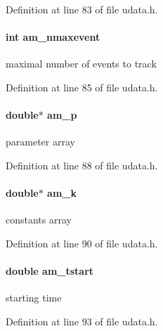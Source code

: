 Definition at line 83 of file udata.\+h.

\hypertarget{struct_user_data_adfa3a6bf6b41a27f98cac31557e6930f}{}
\paragraph[{am\+\_\+nmaxevent}]{\setlength{\rightskip}{0pt plus 5cm}int am\+\_\+nmaxevent}\label{struct_user_data_adfa3a6bf6b41a27f98cac31557e6930f}
maximal number of events to track 

Definition at line 85 of file udata.\+h.

\hypertarget{struct_user_data_a1a679b0e8dfea7d284d777c937d8d13e}{}
\paragraph[{am\+\_\+p}]{\setlength{\rightskip}{0pt plus 5cm}double$\ast$ am\+\_\+p}\label{struct_user_data_a1a679b0e8dfea7d284d777c937d8d13e}
parameter array 

Definition at line 88 of file udata.\+h.

\hypertarget{struct_user_data_a7b59855746129befdcfe9f3c8a4d2a4c}{}
\paragraph[{am\+\_\+k}]{\setlength{\rightskip}{0pt plus 5cm}double$\ast$ am\+\_\+k}\label{struct_user_data_a7b59855746129befdcfe9f3c8a4d2a4c}
constants array 

Definition at line 90 of file udata.\+h.

\hypertarget{struct_user_data_a230439d483e6fde07a6fe687219060c2}{}
\paragraph[{am\+\_\+tstart}]{\setlength{\rightskip}{0pt plus 5cm}double am\+\_\+tstart}\label{struct_user_data_a230439d483e6fde07a6fe687219060c2}
starting time 

Definition at line 93 of file udata.\+h.

